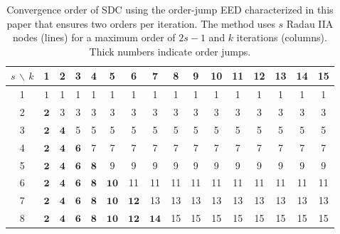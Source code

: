 \documentclass[sn-mathphys-num]{sn-jnl}%
\theoremstyle{thmstyleone}%
\theoremstyle{thmstyletwo}%
\theoremstyle{thmstylethree}%
\begin{document}
\begin{table}[h]
	\bgroup
	\def\arraystretch{1}%
	\begin{tabular}{c||c|c|c|c|c|c|c|c|c|c|c|c|c|c|c|}
		 $s$ $\backslash$ $k$ & 1 & 2 & 3 & 4 & 5 & 6 & 7 & 8 & 9 & 10 & 11 & 12 & 13 & 14 & 15 \\
		\hline
		\hline
		1 & $ 1 $ & 1 & 1 & 1 & 1 & 1 & 1 & 1 & 1 & 1 & 1 & 1 & 1 & 1 & 1 \\
		\hline
		2 & $\bm{2}$ & 3 & 3 & 3 & 3 & 3 & 3 & 3 & 3 & 3 & 3 & 3 & 3 & 3 & 3 \\
		\hline
		3 & $\bm{2}$ & $\bm{4}$ &  5 & 5 & 5 & 5 & 5 & 5 & 5 & 5 & 5 & 5 & 5 & 5 & 5\\
		\hline
		4 & $\bm{2}$ & $\bm{4}$ & $\bm{6}$ & 7 & 7 & 7 & 7 & 7 & 7 & 7 & 7 & 7 & 7 & 7 & 7 \\
		\hline
		5 & $\bm{2}$ & $\bm{4}$ & $\bm{6}$ & $\bm{8}$ & 9 & 9& 9 & 9 & 9 & 9 & 9 & 9 & 9 & 9 & 9 \\
		\hline
		6 & $\bm{2}$ & $\bm{4}$& $\bm{6}$ & $\bm{8}$ & $\bm{10}$ &11&11&11&11&11&11&11&11&11&11 \\
		\hline
		7 & $\bm{2}$ & $\bm{4}$ & $\bm{6}$ & $\bm{8}$ & $\bm{10}$ & $\bm{12}$ & 13 & 13 &13&13&13&13&13&13&13 \\
		\hline
		8 & $\bm{2}$ & $\bm{4}$ & $\bm{6}$ & $\bm{8}$ & $\bm{10}$ & $\bm{12}$ & $\bm{14}$ & 15 &15&15&15&15&15&15&15 \\
		\hline
	\end{tabular}
	\egroup
	\caption{Convergence order of SDC using the order-jump EED characterized in this paper that ensures two orders per iteration. The method uses $s$ Radau IIA nodes (lines) for a maximum order of $2s -1$ and $k$ iterations (columns). Thick numbers indicate order jumps.}
	\label{table:JUMPERRADAU}
\end{table}
\end{document}
